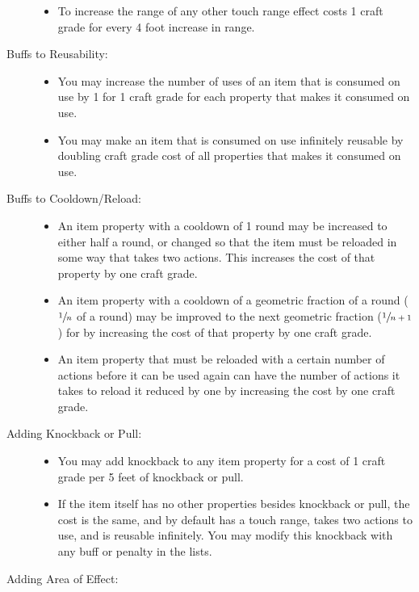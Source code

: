 \begin{description}
\begin{itemize}
		\item To increase the range of any other touch range effect costs 1 craft grade for every 4 foot increase in range.	
	\end{itemize}
	\item[Buffs to Reusability:] \hfill
	\begin{itemize}
		\item You may increase the number of uses of an item that is consumed on use by 1 for 1 craft grade for each property that makes it consumed on use.
		\item You may make an item that is consumed on use infinitely reusable by doubling craft grade cost of all properties that makes it consumed on use.
	\end{itemize}
	\item[Buffs to Cooldown/Reload:] \hfill
	\begin{itemize}
		\item An item property with a cooldown of 1 round may be increased to either half a round, or changed so that the item must be reloaded in some way that takes two actions.
		This increases the cost of that property by one craft grade.
		\item An item property with a cooldown of a geometric fraction of a round ($\sfrac{1}{n}$ of a round) may be improved to the next geometric fraction ($\sfrac{1}{n+1}$) for by increasing the cost of that property by one craft grade.
		\item An item property that must be reloaded with a certain number of actions before it can be used again can have the number of actions it takes to reload it reduced by one by increasing the cost by one craft grade.
	\end{itemize}
	\item[Adding Knockback or Pull:] \hfill
	\begin{itemize}
		\item You may add knockback to any item property for a cost of 1 craft grade per 5 feet of knockback or pull.
		
		\item If the item itself has no other properties besides knockback or pull, the cost is the same, and by default has a touch range, takes two actions to use, and is reusable infinitely. You may modify this knockback with any buff or penalty in the lists.
	\end{itemize}
	\item[Adding Area of Effect:] \hfill
	

\end{description}
